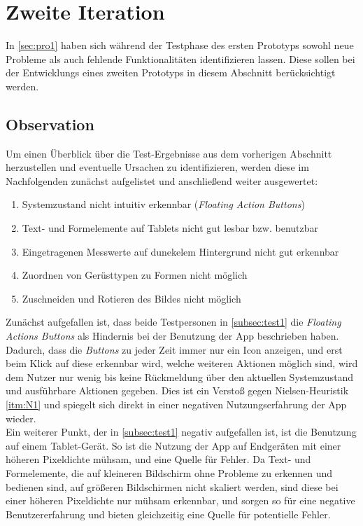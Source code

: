 \section{Zweite Iteration}\label{sec:pro2}

In \autoref{sec:pro1} haben sich während der Testphase des ersten Prototyps sowohl neue Probleme als auch fehlende Funktionalitäten identifizieren lassen.
Diese sollen bei der Entwicklungs eines zweiten Prototyps in diesem Abschnitt berücksichtigt werden. \\

\subsection{Observation}
Um einen Überblick über die Test-Ergebnisse aus dem vorherigen Abschnitt herzustellen und eventuelle Ursachen zu identifizieren, werden diese im Nachfolgenden zunächst aufgelistet und anschließend weiter ausgewertet:

\begin{enumerate}
  \item Systemzustand nicht intuitiv erkennbar (\emph{Floating Action Buttons})
  \item Text- und Formelemente auf Tablets nicht gut lesbar bzw. benutzbar
  \item Eingetragenen Messwerte auf dunekelem Hintergrund nicht gut erkennbar
  \item Zuordnen von Gerüsttypen zu Formen nicht möglich
  \item Zuschneiden und Rotieren des Bildes nicht möglich
\end{enumerate}

\noindent
Zunächst aufgefallen ist, dass beide Testpersonen in \autoref{subsec:test1} die \emph{Floating Actions Buttons} als Hindernis bei der Benutzung der App beschrieben haben.
Dadurch, dass die \emph{Buttons} zu jeder Zeit immer nur ein Icon anzeigen, und erst beim Klick auf diese erkennbar wird, welche weiteren Aktionen möglich sind, wird dem Nutzer nur wenig bis keine Rückmeldung über den aktuellen Systemzustand und ausführbare Aktionen gegeben.
Dies ist ein Verstoß gegen Nielsen-Heuristik \autoref{itm:N1} und spiegelt sich direkt in einer negativen Nutzungserfahrung der App wieder. \\

Ein weiterer Punkt, der in \autoref{subsec:test1} negativ aufgefallen ist, ist die Benutzung auf einem Tablet-Gerät.
So ist die Nutzung der App auf Endgeräten mit einer höheren Pixeldichte mühsam, und eine Quelle für Fehler.
Da Text- und Formelemente, die auf kleineren Bildschirm ohne Probleme zu erkennen und bedienen sind, auf größeren Bildschirmen nicht skaliert werden, sind diese bei einer höheren Pixeldichte nur mühsam erkennbar, und sorgen so für eine negative Benutzererfahrung und bieten gleichzeitig eine Quelle für potentielle Fehler. \\ 

